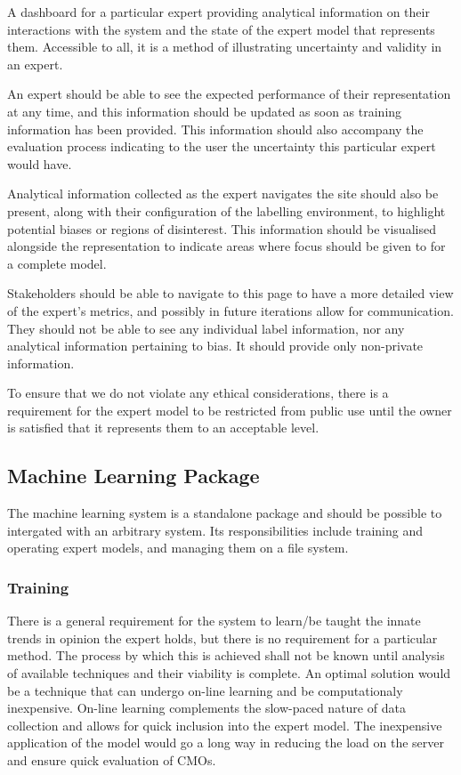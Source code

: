 \documentclass{ecmm427_assignment}
\begin{document}
 A dashboard for a particular expert providing analytical information on their interactions with the system and the state of the expert model that represents them. Accessible to all, it is a method of illustrating uncertainty and validity in an expert.

 An expert should be able to see the expected performance of their representation at any time, and this information should be updated as soon as training information has been provided. This information should also accompany the evaluation process indicating to the user the uncertainty this particular expert would have.

 Analytical information collected as the expert navigates the site should also be present, along with their configuration of the labelling environment, to highlight potential biases or regions of disinterest. This information should be visualised alongside the representation to indicate areas where focus should be given to for a complete model.

 Stakeholders should be able to navigate to this page to have a more detailed view of the expert's metrics, and possibly in future iterations allow for communication. They should not be able to see any individual label information, nor any analytical information pertaining to bias. It should provide only non-private information.
 
To ensure that we do not violate any ethical considerations, there is a requirement for the expert model to be restricted from public use until the owner is satisfied that it represents them to an acceptable level.

\subsection{Machine Learning Package}

The machine learning system is a standalone package and should be possible to intergated with an arbitrary system. Its responsibilities include training and operating expert models, and managing them on a file system.

\subsubsection{Training}

 There is a general requirement for the system to learn/be taught the innate trends in opinion the expert holds, but there is no requirement for a particular method. The process by which this is achieved shall not be known until analysis of available techniques and their viability is complete. An optimal solution would be a technique that can undergo on-line learning and be computationaly inexpensive. On-line learning complements the slow-paced nature of data collection and allows for quick inclusion into the expert model. The inexpensive application of the model would go a long way in reducing the load on the server and ensure quick evaluation of CMOs.
\end{document}
